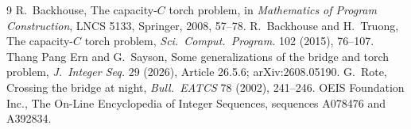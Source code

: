 \documentclass[11pt]{article}
\theoremstyle{remark}
\begin{document}
\begin{thebibliography}{9}
 R.~Backhouse, The capacity-$C$ torch problem, in \emph{Mathematics of Program Construction}, LNCS 5133, Springer, 2008, 57--78.
 R.~Backhouse and H.~Truong, The capacity-$C$ torch problem, \emph{Sci.\ Comput.\ Program.} 102 (2015), 76--107.
 Thang Pang Ern and G.~Sayson, Some generalizations of the bridge and torch problem, \emph{J.\ Integer Seq.} 29 (2026), Article 26.5.6; arXiv:2608.05190.
 G.~Rote, Crossing the bridge at night, \emph{Bull.\ EATCS} 78 (2002), 241--246.
 OEIS Foundation Inc., The On-Line Encyclopedia of Integer Sequences, sequences A078476 and A392834.
\end{thebibliography}
\end{document}

